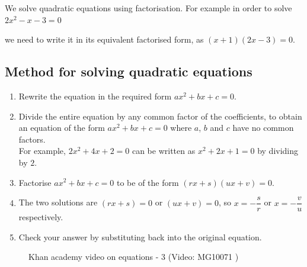 We solve quadratic equations using factorisation. For example in order to solve $2{x}^{2}-x-3 = 0$

we need to write it in its equivalent factorised form, as $(x+1)(2x-3)=0$.


\subsection*{Method for solving quadratic equations}
\begin{enumerate}[noitemsep, label=\textbf{\arabic*}. ] 
\item Rewrite the equation in the required form $ax^{2} +bx +c =0$.
\item Divide the entire equation by any common factor of the coefficients,
to obtain an equation of the form $a{x}^{2}+bx+c=0$ where $a$, $b$ and
$c$ have no common factors.
\\For example, $2{x}^{2}+4x+2=0$ can be written as
${x}^{2}+2x+1=0$ by dividing by $2$.
\item Factorise $a{x}^{2}+bx+c=0$ to be of the form $(rx+s)(ux+v)=0$.

\item The two solutions are $(rx+s)=0$ or $(ux+v)=0$, so $x = -\dfrac{s}{r}$ or $x=-\dfrac{v}{u}$ respectively.
\item Check your answer by substituting back into the original equation.
\end{enumerate}

\setcounter{subfigure}{0}
\begin{figure}[H] %
\textnormal{Khan academy video on equations - 3}\vspace{.1in} \nSolve 
\label{m39247*yt-media3}\label{m39247*yt-video3}
 { (Video:  MG10071 )}
\vspace{2pt}
\vspace{.1in}
\end{figure}

